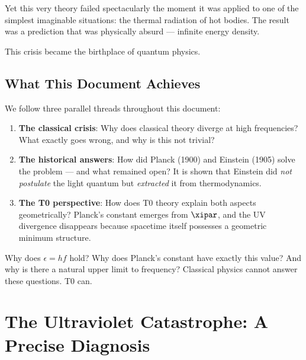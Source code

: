 Yet this very theory failed spectacularly the moment it was applied to one of the 
simplest imaginable situations: the thermal radiation of hot bodies. The result was 
a prediction that was physically absurd — infinite energy density.

This crisis became the birthplace of quantum physics.

\subsection{What This Document Achieves}

We follow three parallel threads throughout this document:

\begin{enumerate}
    \item \textbf{The classical crisis}: Why does classical theory diverge at high 
    frequencies? What exactly goes wrong, and why is this not trivial?
    
    \item \textbf{The historical answers}: How did Planck (1900) and Einstein (1905) 
    solve the problem — and what remained open? It is shown that Einstein did 
    \emph{not postulate} the light quantum but \emph{extracted} it from thermodynamics.
    
    \item \textbf{The T0 perspective}: How does T0 theory explain both aspects 
    geometrically? Planck's constant emerges from $\xipar$, and the UV divergence 
    disappears because spacetime itself possesses a geometric minimum structure.
\end{enumerate}

\begin{important}
    Why does $\epsilon = hf$ hold? Why does Planck's constant have exactly this value? 
    And why is there a natural upper limit to frequency? Classical physics cannot 
    answer these questions. T0 can.
\end{important}

\clearpage

\section{The Ultraviolet Catastrophe: A Precise Diagnosis}
\label{sec:uv_catastrophe}

